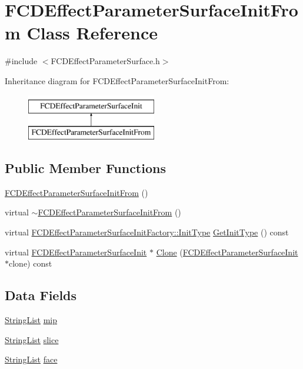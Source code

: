 \hypertarget{classFCDEffectParameterSurfaceInitFrom}{
\section{FCDEffectParameterSurfaceInitFrom Class Reference}
\label{classFCDEffectParameterSurfaceInitFrom}
}


{\ttfamily \#include $<$FCDEffectParameterSurface.h$>$}

Inheritance diagram for FCDEffectParameterSurfaceInitFrom:\begin{figure}[H]
\begin{center}
\leavevmode
\includegraphics[height=2.000000cm]{classFCDEffectParameterSurfaceInitFrom}
\end{center}
\end{figure}
\subsection*{Public Member Functions}
\begin{DoxyCompactItemize}
\item 
\hyperlink{classFCDEffectParameterSurfaceInitFrom_a308effcaf25b329f368d02f4efcc2ecb}{FCDEffectParameterSurfaceInitFrom} ()
\item 
virtual \hyperlink{classFCDEffectParameterSurfaceInitFrom_a3de6ed57df62c569a872995a95bce88f}{$\sim$FCDEffectParameterSurfaceInitFrom} ()
\item 
virtual \hyperlink{classFCDEffectParameterSurfaceInitFactory_a65e74f1159865702cac5236dd5d83892}{FCDEffectParameterSurfaceInitFactory::InitType} \hyperlink{classFCDEffectParameterSurfaceInitFrom_a33c2001f6d11fe519d7f5c492daec92a}{GetInitType} () const 
\item 
virtual \hyperlink{classFCDEffectParameterSurfaceInit}{FCDEffectParameterSurfaceInit} $\ast$ \hyperlink{classFCDEffectParameterSurfaceInitFrom_a8a173445b78914cf1ed6f222ffb7ba0b}{Clone} (\hyperlink{classFCDEffectParameterSurfaceInit}{FCDEffectParameterSurfaceInit} $\ast$clone) const 
\end{DoxyCompactItemize}
\subsection*{Data Fields}
\begin{DoxyCompactItemize}
\item 
\hyperlink{classfm_1_1vector}{StringList} \hyperlink{classFCDEffectParameterSurfaceInitFrom_ac7df5eff72c2fa2a183bacdfc3ac3799}{mip}
\item 
\hyperlink{classfm_1_1vector}{StringList} \hyperlink{classFCDEffectParameterSurfaceInitFrom_a9abea30f2ccd2f28a50d5678d22135cb}{slice}
\item 
\hyperlink{classfm_1_1vector}{StringList} \hyperlink{classFCDEffectParameterSurfaceInitFrom_a78e6c19391ebf68c392be301db666ac8}{face}
\end{DoxyCompactItemize}


